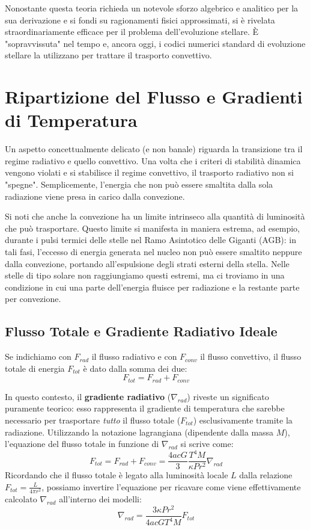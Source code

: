 Nonostante questa teoria richieda un notevole sforzo algebrico e analitico per la sua derivazione e si fondi su ragionamenti fisici approssimati, si è rivelata straordinariamente efficace per il problema dell'evoluzione stellare. È "sopravvissuta" nel tempo e, ancora oggi, i codici numerici standard di evoluzione stellare la utilizzano per trattare il trasporto convettivo.

\section{Ripartizione del Flusso e Gradienti di Temperatura}

Un aspetto concettualmente delicato (e non banale) riguarda la transizione tra il regime radiativo e quello convettivo.
Una volta che i criteri di stabilità dinamica vengono violati e si stabilisce il regime convettivo, il trasporto radiativo non si "spegne". Semplicemente, l'energia che non può essere smaltita dalla sola radiazione viene presa in carico dalla convezione.

Si noti che anche la convezione ha un limite intrinseco alla quantità di luminosità che può trasportare. Questo limite si manifesta in maniera estrema, ad esempio, durante i pulsi termici delle stelle nel Ramo Asintotico delle Giganti (AGB): in tali fasi, l'eccesso di energia generata nel nucleo non può essere smaltito neppure dalla convezione, portando all'espulsione degli strati esterni della stella.
Nelle stelle di tipo solare non raggiungiamo questi estremi, ma ci troviamo in una condizione in cui una parte dell'energia fluisce per radiazione e la restante parte per convezione.

\subsection{Flusso Totale e Gradiente Radiativo Ideale}

Se indichiamo con $F_{rad}$ il flusso radiativo e con $F_{conv}$ il flusso convettivo, il flusso totale di energia $F_{tot}$ è dato dalla somma dei due:
\begin{equation}
F_{tot} = F_{rad} + F_{conv}
\end{equation}

In questo contesto, il \textbf{gradiente radiativo} ($\nabla_{rad}$) riveste un significato puramente teorico: esso rappresenta il gradiente di temperatura che sarebbe necessario per trasportare \textit{tutto} il flusso totale ($F_{tot}$) esclusivamente tramite la radiazione.
Utilizzando la notazione lagrangiana (dipendente dalla massa $M$), l'equazione del flusso totale in funzione di $\nabla_{rad}$ si scrive come:
\begin{equation}
F_{tot} = F_{rad} + F_{conv} = \frac{4 a c G}{3} \frac{T^4 M}{\kappa P r^2} \nabla_{rad}
\end{equation}
Ricordando che il flusso totale è legato alla luminosità locale $L$ dalla relazione $F_{tot} = \frac{L}{4 \pi r^2}$, possiamo invertire l'equazione per ricavare come viene effettivamente calcolato $\nabla_{rad}$ all'interno dei modelli:
\begin{equation}
\nabla_{rad} = \frac{3 \kappa P r^2}{4 a c G T^4 M} F_{tot}
\end{equation}


